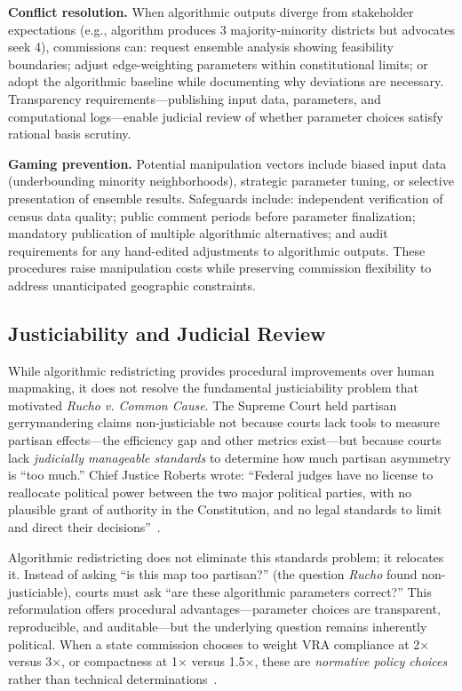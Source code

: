 \textbf{Conflict resolution.} When algorithmic outputs diverge from stakeholder expectations (e.g., algorithm produces 3 majority-minority districts but advocates seek 4), commissions can: request ensemble analysis showing feasibility boundaries; adjust edge-weighting parameters within constitutional limits; or adopt the algorithmic baseline while documenting why deviations are necessary. Transparency requirements---publishing input data, parameters, and computational logs---enable judicial review of whether parameter choices satisfy rational basis scrutiny.

\textbf{Gaming prevention.} Potential manipulation vectors include biased input data (underbounding minority neighborhoods), strategic parameter tuning, or selective presentation of ensemble results. Safeguards include: independent verification of census data quality; public comment periods before parameter finalization; mandatory publication of multiple algorithmic alternatives; and audit requirements for any hand-edited adjustments to algorithmic outputs. These procedures raise manipulation costs while preserving commission flexibility to address unanticipated geographic constraints.

\subsection{Justiciability and Judicial Review}

While algorithmic redistricting provides procedural improvements over human mapmaking, it does not resolve the fundamental justiciability problem that motivated \emph{Rucho v. Common Cause}. The Supreme Court held partisan gerrymandering claims non-justiciable not because courts lack tools to measure partisan effects---the efficiency gap and other metrics exist---but because courts lack \emph{judicially manageable standards} to determine how much partisan asymmetry is ``too much.'' Chief Justice Roberts wrote: ``Federal judges have no license to reallocate political power between the two major political parties, with no plausible grant of authority in the Constitution, and no legal standards to limit and direct their decisions''~\cite{rucho2019}.

Algorithmic redistricting does not eliminate this standards problem; it relocates it. Instead of asking ``is this map too partisan?'' (the question \emph{Rucho} found non-justiciable), courts must ask ``are these algorithmic parameters correct?'' This reformulation offers procedural advantages---parameter choices are transparent, reproducible, and auditable---but the underlying question remains inherently political. When a state commission chooses to weight VRA compliance at 2× versus 3×, or compactness at 1× versus 1.5×, these are \emph{normative policy choices} rather than technical determinations~\cite{deluca2026edgeweighted}.

